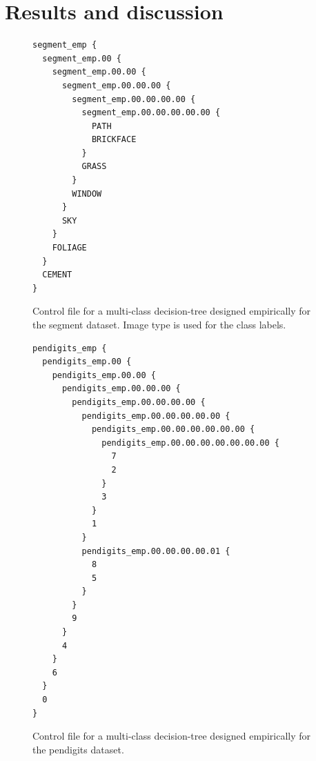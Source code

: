\documentclass{article}
\begin{document}
\section{Results and discussion}

\label{results}



\begin{figure}[htp]
	\begin{boxedminipage}{\textwidth}
		\begin{small}
		\begin{verbatim}
segment_emp {
  segment_emp.00 {
    segment_emp.00.00 {
      segment_emp.00.00.00 {
        segment_emp.00.00.00.00 {
          segment_emp.00.00.00.00.00 {
            PATH
            BRICKFACE
          }
          GRASS
        }
        WINDOW
      }
      SKY
    }
    FOLIAGE
  }
  CEMENT
}
		\end{verbatim}
		\end{small}
	\end{boxedminipage}
	\caption{Control file for a multi-class decision-tree designed empirically for the segment dataset. Image type is used for the class labels.}
	\label{segment}
\end{figure}

\begin{figure}[htp]
	\begin{boxedminipage}{\textwidth}
		\begin{small}
		\begin{verbatim}
pendigits_emp {
  pendigits_emp.00 {
    pendigits_emp.00.00 {
      pendigits_emp.00.00.00 {
        pendigits_emp.00.00.00.00 {
          pendigits_emp.00.00.00.00.00 {
            pendigits_emp.00.00.00.00.00.00 {
              pendigits_emp.00.00.00.00.00.00.00 {
                7
                2
              }
              3
            }
            1
          }
          pendigits_emp.00.00.00.00.01 {
            8
            5
          }
        }
        9
      }
      4
    }
    6
  }
  0
}
		\end{verbatim}
		\end{small}
	\end{boxedminipage}
	\caption{Control file for a multi-class decision-tree designed empirically for the pendigits dataset.}
	\label{pendigits}
\end{figure}
\end{document}

